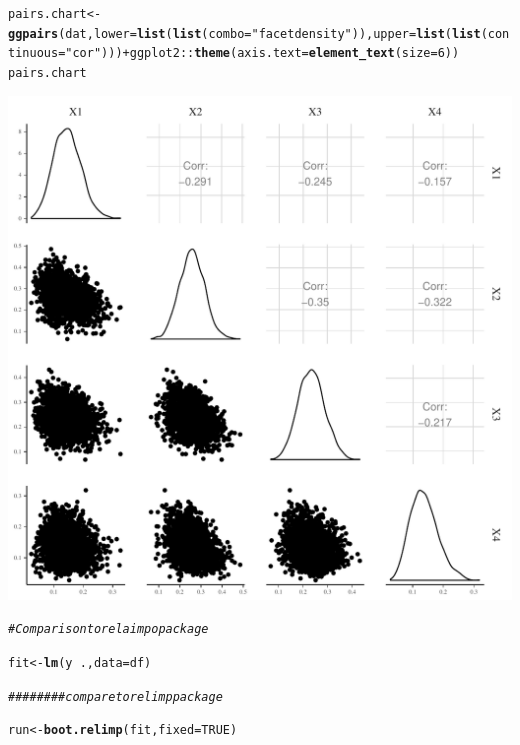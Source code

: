 \documentclass[11pt,a4paper,twoside]{book}\usepackage[]{graphicx}\usepackage[]{color}
\makeatletter
\def\maxwidth{ %
  \ifdim\Gin@nat@width>\linewidth
    \linewidth
  \else
    \Gin@nat@width
  \fi
}
\newcommand{\hlnum}[1]{\textcolor[rgb]{0.686,0.059,0.569}{#1}}%
\newcommand{\hlstr}[1]{\textcolor[rgb]{0.192,0.494,0.8}{#1}}%
\newcommand{\hlcom}[1]{\textcolor[rgb]{0.678,0.584,0.686}{\textit{#1}}}%
\newcommand{\hlopt}[1]{\textcolor[rgb]{0,0,0}{#1}}%
\newcommand{\hlstd}[1]{\textcolor[rgb]{0.345,0.345,0.345}{#1}}%
\newcommand{\hlkwb}[1]{\textcolor[rgb]{0.69,0.353,0.396}{#1}}%
\newcommand{\hlkwc}[1]{\textcolor[rgb]{0.333,0.667,0.333}{#1}}%
\newcommand{\hlkwd}[1]{\textcolor[rgb]{0.737,0.353,0.396}{\textbf{#1}}}%
\newenvironment{kframe}{%
 \def\at@end@of@kframe{}%
 \ifinner\ifhmode%
  \def\at@end@of@kframe{\end{minipage}}%
  \begin{minipage}{\columnwidth}%
 \fi\fi%
 \def\FrameCommand##1{\hskip\@totalleftmargin \hskip-\fboxsep
 \colorbox{shadecolor}{##1}\hskip-\fboxsep
     \hskip-\linewidth \hskip-\@totalleftmargin \hskip\columnwidth}%
 \MakeFramed {\advance\hsize-\width
   \@totalleftmargin\z@ \linewidth\hsize
   \@setminipage}}%
 {\par\unskip\endMakeFramed%
 \at@end@of@kframe}
\newenvironment{knitrout}{}{} %
\makeatother
\begin{document}
\begin{knitrout}
\begin{kframe}
\begin{alltt}
\hlstd{pairs.chart} \hlkwb{<-} \hlkwd{ggpairs}\hlstd{(dat,} \hlkwc{lower} \hlstd{=} \hlkwd{list}\hlstd{(}\hlkwd{list}\hlstd{(}\hlkwc{combo} \hlstd{=} \hlstr{"facetdensity"}\hlstd{)),} \hlkwc{upper} \hlstd{=} \hlkwd{list}\hlstd{(}\hlkwd{list}\hlstd{(}\hlkwc{continuous} \hlstd{=} \hlstr{"cor"}\hlstd{)))} \hlopt{+} \hlstd{ggplot2}\hlopt{::}\hlkwd{theme}\hlstd{(}\hlkwc{axis.text} \hlstd{=} \hlkwd{element_text}\hlstd{(}\hlkwc{size} \hlstd{=} \hlnum{6}\hlstd{))}
\hlstd{pairs.chart}
\end{alltt}
\end{kframe}
\includegraphics[width=\maxwidth]{figure/ch03_figsimdata_LMG-1} 
\begin{kframe}\begin{alltt}
\hlcom{# Comparison to relaimpo package}

\hlstd{fit} \hlkwb{<-} \hlkwd{lm}\hlstd{(y}\hlopt{~}\hlstd{.,} \hlkwc{data}\hlstd{=df)}

\hlcom{######## compare to relimp package}

\hlstd{run}\hlkwb{<-}\hlkwd{boot.relimp}\hlstd{(fit,} \hlkwc{fixed}\hlstd{=}\hlnum{TRUE}\hlstd{)}


\end{alltt}
\end{kframe}
\end{knitrout}
\end{document}
